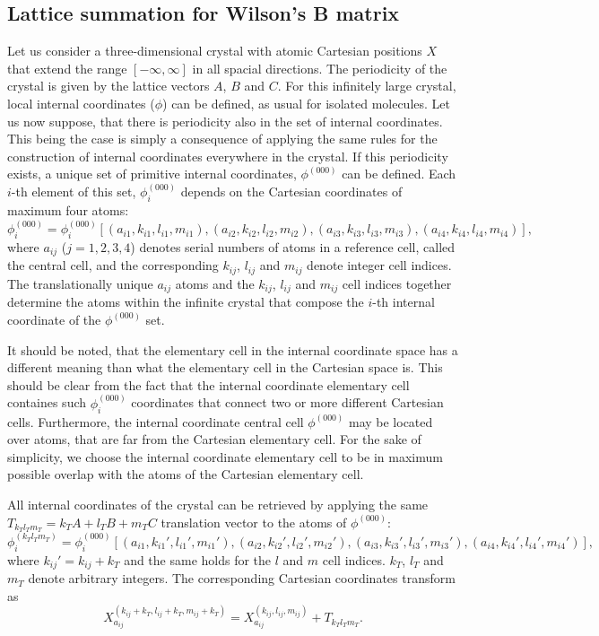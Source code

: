 \documentclass[prl,aps,preprint,superbib,12pt]{revtex4}
\begin{document}
\subsection{Lattice summation for Wilson's B matrix}
Let us consider a three-dimensional crystal with atomic 
Cartesian positions $X$ that extend the range $[-\infty,\infty]$
in all spacial directions. The periodicity of the crystal
is given by the lattice vectors $A$, $B$ and $C$.
For this infinitely large crystal, local internal coordinates ($\phi$) 
can be defined, as usual for isolated molecules. Let us now suppose,
that there is periodicity also in the set of internal coordinates.
This being the case is simply a consequence of applying the 
same rules for the 
construction of internal coordinates everywhere in the crystal.
If this periodicity exists, a unique set of primitive internal 
coordinates, $\phi^{(000)}$ can be defined. Each $i$-th element of this
set, $\phi^{(000)}_{i}$ depends on the Cartesian coordinates of
maximum four atoms: 
\begin{equation}
\phi^{(000)}_{i}=\phi^{(000)}_{i}[
(a_{i1},k_{i1},l_{i1},m_{i1}),
(a_{i2},k_{i2},l_{i2},m_{i2}),
(a_{i3},k_{i3},l_{i3},m_{i3}),
(a_{i4},k_{i4},l_{i4},m_{i4})],
\end{equation}
where $a_{ij}$ ($j=1,2,3,4$) denotes serial numbers of atoms in 
a reference cell, called the 
central cell, and the corresponding $k_{ij}$, $l_{ij}$ and $m_{ij}$ 
denote integer cell indices.
The translationally unique $a_{ij}$ atoms and the 
$k_{ij}$, $l_{ij}$ and $m_{ij}$ 
cell indices together determine
the atoms within the infinite crystal that compose 
the $i$-th internal coordinate of the $\phi^{(000)}$ set. 

It should be noted, that the elementary cell in the
internal coordinate space has a different meaning than what 
the elementary cell in the Cartesian space is. This should
be clear from the fact that the internal coordinate elementary cell 
containes such $\phi^{(000)}_{i}$ coordinates that connect
two or more different Cartesian cells. Furthermore, the internal
coordinate central cell $\phi^{(000)}$ may be located over atoms, 
that are far
from the Cartesian elementary cell. For the sake of simplicity,
we choose the internal coordinate elementary cell to be in maximum
possible overlap with the atoms of the Cartesian elementary cell.

All internal coordinates of the crystal can be retrieved
by applying the same $T_{k_{T}l_{T}m_{T}}=k_{T}A+l_{T}B+m_{T}C$ 
translation vector to the atoms of $\phi^{(000)}$: 
\begin{equation}
\phi^{(k_{T}l_{T}m_{T})}_{i}=\phi^{(000)}_{i}[
(a_{i1},k_{i1}',l_{i1}',m_{i1}'),
(a_{i2},k_{i2}',l_{i2}',m_{i2}'),
(a_{i3},k_{i3}',l_{i3}',m_{i3}'),
(a_{i4},k_{i4}',l_{i4}',m_{i4}')] ,
\end{equation}
where $k_{ij}'=k_{ij}+k_{T}$ and the same holds for the $l$ and $m$ 
cell indices.
$k_{T}$, $l_{T}$ and $m_{T}$ denote arbitrary integers.
The corresponding Cartesian coordinates transform as
\begin{equation}
X^{(k_{ij}+k_{T},l_{ij}+k_{T},m_{ij}+k_{T})}_{a_{ij}} 
= X^{(k_{ij},l_{ij},m_{ij})}_{a_{ij}} + T_{k_{T}l_{T}m_{T}} .
\end{equation} 
\end{document}
